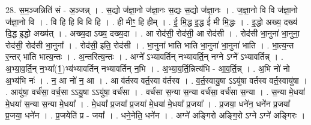 \documentclass[17pt]{extarticle}
\begin{document}
28. स॒म॒ञ्जन्निति॑ सं - अ॒ञ्जन्न् । . स॒द्यो ज॑ज्ञा॒नो ज॑ज्ञा॒नः स॒द्यः स॒द्यो ज॑ज्ञा॒नः । . ज॒ज्ञा॒नो वि वि ज॑ज्ञा॒नो ज॑ज्ञा॒नो वि । . वि हि हि वि वि हि । . ही मीꣳ॒॒ हि हीम् । . ई॒ मि॒द्ध इ॒द्ध ई॑ मी मि॒द्धः । . इ॒द्धो अख्य॒ दख्य॑ दि॒द्ध इ॒द्धो अख्य॑त् । . अख्य॒दा ऽख्य॒ दख्य॒दा । . आ रोद॑सी॒ रोद॑सी॒ आ रोद॑सी । . रोद॑सी भा॒नुना॑ भा॒नुना॒ रोद॑सी॒ रोद॑सी भा॒नुना᳚ । . रोद॑सी॒ इति॒ रोद॑सी । . भा॒नुना॑ भाति भाति भा॒नुना॑ भा॒नुना॑ भाति । . भा॒त्य॒न्त र॒न्तर् भा॑ति भात्य॒न्तः । . अ॒न्तरित्य॒न्तः । . अग्ने᳚ ऽभ्यावर्तिन् नभ्यावर्ति॒न् नग्ने ऽग्ने᳚ ऽभ्यावर्तिन्न् । . अ॒भ्या॒व॒र्ति॒न् न॒भ्या᳚(1॒)भ्य॑भ्यावर्तिन् नभ्यावर्तिन् न॒भि । . अ॒भ्या॒व॒र्ति॒न्नित्य॑भि - आ॒व॒र्ति॒न्न् । . अ॒भि नो॑ नो अ॒भ्य॑भि नः॑ । . न॒ आ नो॑ न॒ आ । . आ व॑र्तस्व वर्त॒स्वा व॑र्तस्व । . व॒र्त॒स्वायु॒षा ऽऽयु॑षा वर्तस्व वर्त॒स्वायु॑षा । . आयु॑षा॒ वर्च॑सा॒ वर्च॒सा ऽऽयु॒षा ऽऽयु॑षा॒ वर्च॑सा । . वर्च॑सा स॒न्या स॒न्या वर्च॑सा॒ वर्च॑सा स॒न्या । . स॒न्या मे॒धया॑ मे॒धया॑ स॒न्या स॒न्या मे॒धया᳚ । . मे॒धया᳚ प्र॒जया᳚ प्र॒जया॑ मे॒धया॑ मे॒धया᳚ प्र॒जया᳚ । . प्र॒जया॒ धने॑न॒ धने॑न प्र॒जया᳚ प्र॒जया॒ धने॑न । . प्र॒जयेति॑ प्र - जया᳚ । . धने॒नेति॒ धने॑न । . अग्ने॑ अङ्गिरो अङ्गि॒रो ऽग्ने ऽग्ने॑ अङ्गिरः । \newline
\end{document}
